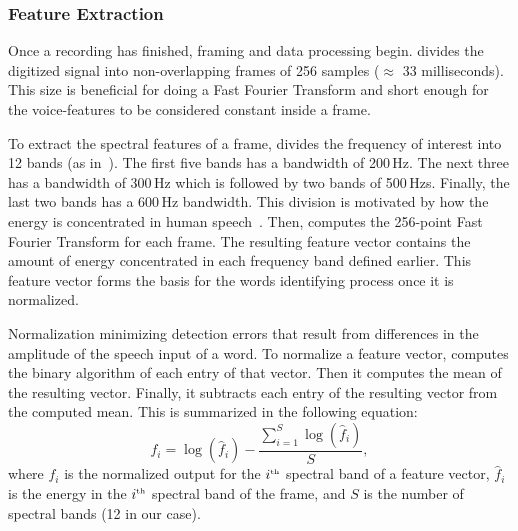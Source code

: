\subsubsection{Feature Extraction}
Once a recording has finished, framing and data processing begin. \cim divides the digitized signal into non-overlapping frames of 256 samples ($\approx$ 33 milliseconds). This size is beneficial for doing a Fast Fourier Transform and short enough for the voice-features to be considered constant inside a frame.

To extract the spectral features of a frame, \cim divides the frequency of interest into 12 bands (as in~\cite{hopper1992}). The first five bands has a bandwidth of 200\,Hz. The next three has a bandwidth of 300\,Hz which is followed by two bands of 500\,Hzs. Finally, the last two bands has a 600\,Hz bandwidth. This division is motivated by how the energy is concentrated in human speech~\cite{hopper1992}. Then, \cim computes the 256-point Fast Fourier Transform for each frame. The resulting feature vector contains the amount of energy concentrated in each frequency band defined earlier. This feature vector forms the basis for the words identifying process once it is normalized.

Normalization minimizing detection errors that result from differences in the amplitude of the speech input of a word. To normalize a feature vector, \cim computes the binary algorithm of each entry of that vector. 
Then it computes the mean of the resulting vector. Finally, it subtracts each entry of the resulting vector from the computed mean. This is summarized in the following equation: 
\begin{equation}
    f_i = \log(\hat{f}_i) - \frac{\sum\limits^S_{i=1}\log(\hat{f}_i)}{S},
\end{equation}
where $f_i$ is the normalized output for the $i^{\text{\tiny th}}$ spectral band of a feature vector, $\hat{f}_i$ is the energy in the $i^{\text{\tiny th}}$ spectral band of the frame, and $S$ is the number of spectral bands (12 in our case). 

